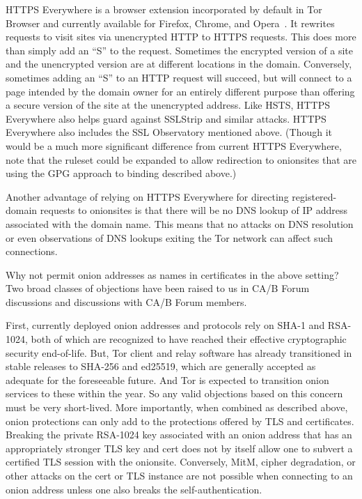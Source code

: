 \documentclass[10pt]{styles/IEEEtran}
\begin{document}
HTTPS Everywhere is a browser extension incorporated by default in Tor
Browser and currently available for Firefox, Chrome, and
Opera~\cite{https-everywhere}. It rewrites requests to visit sites via
unencrypted HTTP to HTTPS requests. This does more than simply add an
``S'' to the request. Sometimes the encrypted version of a site and
the unencrypted version are at different locations in the domain.
Conversely, sometimes adding an ``S'' to an HTTP request will
succeed, but will connect to a page intended by the domain owner for an
entirely different purpose than offering a secure version of the site
at the unencrypted address.  Like HSTS, HTTPS Everywhere also helps
guard against SSLStrip and similar attacks. HTTPS Everywhere
also includes the SSL Observatory mentioned above.
(Though it would be a much more significant difference from current HTTPS
Everywhere, note that the ruleset could be expanded to allow redirection
to onionsites that are using the GPG approach to binding described
above.)

Another advantage of relying on HTTPS Everywhere for directing
registered-domain requests to onionsites is that there will
be no DNS lookup of IP address associated with the domain name.
This means that no attacks on DNS resolution or even observations
of DNS lookups exiting the Tor network can affect such connections.


Why not permit onion addresses as names in certificates in the above
setting? Two broad classes of objections have been raised to us in
CA/B Forum discussions and discussions with CA/B Forum members.

First, currently deployed onion addresses and protocols rely on SHA-1
and RSA-1024, both of which are recognized to have reached their
effective cryptographic security end-of-life. But, Tor client and
relay software has already transitioned in stable releases to SHA-256
and ed25519, which are generally accepted as adequate for the
foreseeable future. And Tor is expected to transition onion services
to these within the year. So any valid objections based on this
concern must be very short-lived.  More importantly, when combined as
described above, onion protections can only add to the
protections offered by TLS and certificates. Breaking the
private RSA-1024 key associated with an onion address that has an
appropriately stronger TLS key and cert does not by itself allow one
to subvert a certified TLS session with the onionsite. Conversely,
MitM, cipher degradation, or other attacks on the cert or TLS instance
are not possible when connecting to an onion address unless one also breaks
the self-authentication.
\end{document}
